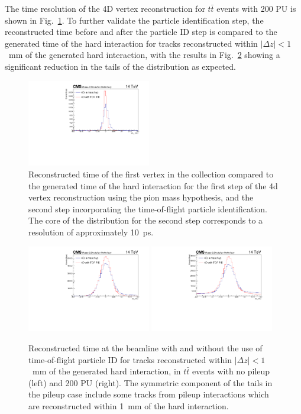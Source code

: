 The time resolution of the 4D vertex reconstruction for $t\bar t$ events with 200 PU is shown in Fig.~\ref{fig:vtxdtgen}.  To further validate the particle identification step, the reconstructed time before and after the particle ID step is compared to the generated time of the hard interaction for tracks reconstructed within $|\Delta z|<1$~mm of the generated hard interaction, with the results in Fig.~\ref{fig:pidtres} showing a significant reduction in the tails of the distribution as expected.

\begin{figure}[!hbtp]
\centering
\includegraphics[width=0.48\textwidth]{fig/performance/4dvtx/ttbarpu200/dtvtxgen_pu200_prelim.pdf}
\caption{Reconstructed time of the first vertex in the collection compared to the generated time of the hard interaction for the first step of the 4d vertex reconstruction using the pion mass hypothesis, and the second step incorporating the time-of-flight particle identification.  The core of the distribution for the second step corresponds to a resolution of approximately 10~ps.}
\label{fig:vtxdtgen}
\end{figure}

\begin{figure}[!hbtp]
\centering
\includegraphics[width=0.48\textwidth]{fig/performance/4dvtx/ttbarnopu/dttrkgen_nopu_prelim.pdf}
\includegraphics[width=0.48\textwidth]{fig/performance/4dvtx/ttbarpu200/dttrkgen_pu200_prelim.pdf}
\caption{Reconstructed time at the beamline with and without the use of time-of-flight particle ID for tracks reconstructed within $|\Delta z|<1$~mm of the generated hard interaction, in $t\bar t$ events with no pileup (left) and 200 PU (right).  The symmetric component of the tails in the pileup case include some tracks from pileup interactions which are reconstructed within 1~mm of the hard interaction.}
\label{fig:pidtres}
\end{figure}
